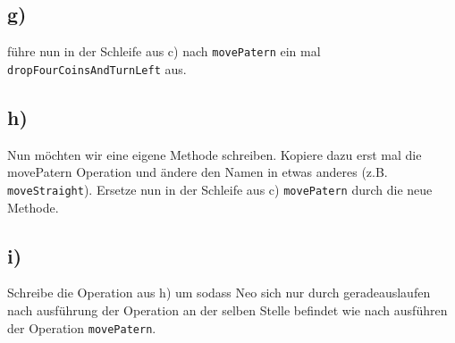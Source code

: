 \subsection*{g)}
führe nun in der Schleife aus c) nach \lstinline{movePatern} ein mal \lstinline{dropFourCoinsAndTurnLeft} aus.
\subsection*{h)}
Nun möchten wir eine eigene Methode schreiben. Kopiere dazu erst mal die movePatern Operation und ändere den Namen in etwas anderes (z.B. \lstinline{moveStraight}).
Ersetze nun in der Schleife aus c) \lstinline{movePatern} durch die neue Methode.
\subsection*{i)}
Schreibe die Operation aus h) um sodass Neo sich nur durch geradeauslaufen nach ausführung der Operation an der selben Stelle befindet wie nach ausführen der Operation  \lstinline{movePatern}.
\newpage
